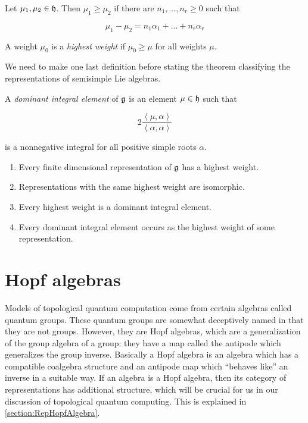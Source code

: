 \begin{defn}
Let $\mu_1, \mu_2 \in \mathfrak{h}$. Then $\mu_1 \geq \mu_2$ if there are $n_1, \ldots, n_r \geq 0$ such that 

\begin{equation}
\mu_1 - \mu_2 = n_1 \alpha_1 + \ldots + n_r \alpha_r
\end{equation}

A weight $\mu_0$ is a \emph{highest weight} if $\mu_0 \geq \mu$ for all weights $\mu$.

\end{defn}

We need to make one last definition before stating the theorem classifying the representations of semisimple Lie algebras.

\begin{defn}
A \emph{dominant integral element} of $\mathfrak{g}$ is an element $\mu \in \mathfrak{h}$ such that

\begin{equation}
2 \frac{\left<\mu,\alpha\right>}{\left<\alpha,\alpha\right>}
\end{equation}

is a nonnegative integral for all positive simple roots $\alpha$.
\end{defn}
\begin{theorem}
\begin{enumerate}
\item Every finite dimensional representation of $\mathfrak{g}$ has a highest weight.
\item Representations with the same highest weight are isomorphic.
\item Every highest weight is a dominant integral element.
\item Every dominant integral element occurs as the highest weight of some representation.
\end{enumerate}
\end{theorem}



\section{Hopf algebras}

Models of topological quantum computation come from certain algebras called
quantum groups. These quantum groups are somewhat deceptively named in that
they are not groups. However, they are Hopf algebras, which  are a
generalization of the group algebra of a group: they have a map called the
antipode which generalizes the group inverse. Basically a Hopf algebra is an
algebra which has a compatible coalgebra structure and an antipode map which
``behaves like'' an inverse in a suitable way. If an algebra is a Hopf algebra,
then its category of representations has additional structure, which will
be crucial for us in our discussion of topological quantum computing. This is
explained in \ref{section:RepHopfAlgebra}. 

